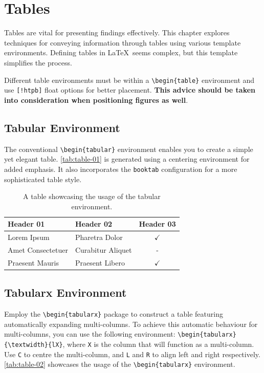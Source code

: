 \section{Tables}
Tables are vital for presenting findings effectively. This chapter explores techniques for conveying information through tables using various template environments. Defining tables in \LaTeX\ seems complex, but this template simplifies the process.

\begin{block}[tip]
Different table environments must be within a \texttt{\textbackslash begin\{table\}} environment and use \texttt{[!htpb]} float options for better placement. \textbf{This advice should be taken into consideration when positioning figures as well}.
\end{block}

\subsection{Tabular Environment}
The conventional \verb|\begin{tabular}| environment enables you to create a simple yet elegant table. \autoref{tab:table-01} is generated using a centering environment for added emphasis. It also incorporates the \verb|booktab| configuration for a more sophisticated table style.

\begin{table}[!htpb]
    \caption{A table showcasing the usage of the tabular environment.}
    \label{tab:table-01}
    \centering
    \begin{tabular}{llc}
        \toprule
        \textbf{Header 01} & \textbf{Header 02} & \textbf{Header 03} \\ 
        \midrule
        Lorem Ipsum         & Pharetra Dolor    & $\checkmark$  \\
        Amet Consectetuer   & Curabitur Aliquet & -             \\
        Praesent Mauris     & Praesent Libero   & $\checkmark$  \\
        \bottomrule
    \end{tabular}
\end{table}

\subsection{Tabularx Environment}
Employ the \verb|\begin{tabularx}| package to construct a table featuring automatically expanding multi-columns. To achieve this automatic behaviour for multi-columns, you can use the following environment: \verb|\begin{tabularx}{\textwidth}{lX}|, where \verb|X| is the column that will function as a multi-column. Use \verb|C| to centre the multi-column, and \verb|L| and \verb|R| to align left and right respectively. \autoref{tab:table-02} showcases the usage of the \verb|\begin{tabularx}| environment.

